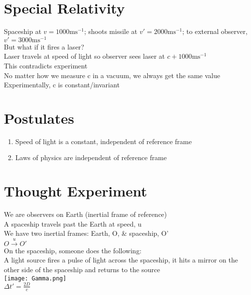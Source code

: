 \documentclass[a4paper, 11pt, fleqn, normalem]{report}
\begin{document}
\section{Special Relativity}
Spaceship at $v = 1000\text{ms}^{-1}$; shoots missile at $v' = 2000\text{ms}^{-1}$; to external observer, $v' = 3000\text{ms}^{-1}$ \\
But what if it fires a laser? \\
Laser travels at speed of light so observer sees laser at $c + 1000\text{ms}^{-1}$ \\
This contradicts experiment \\
No matter how we measure c in a vacuum, we always get the same value \\
Experimentally, c is constant/invariant

\section{Postulates}
\begin{enumerate}
    \item Speed of light is a constant, independent of reference frame
    \item Laws of physics are independent of reference frame
\end{enumerate}

\section{Thought Experiment}
We are observers on Earth (inertial frame of reference) \\
A spaceship travels past the Earth at speed, u \\
We have two inertial frames: Earth, O, \& spaceship, O' \\
$O \xrightarrow{u} O'$ \\
On the spaceship, someone does the following: \\
A light source fires a pulse of light across the spaceship, it hits a mirror on the other side of the spaceship and returns to the source \\
\texttt{[image: Gamma.png]} \\
$\Delta t' = \frac{2D}{c}$
\end{document}
